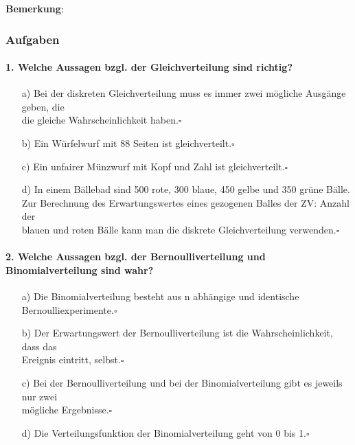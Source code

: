 \documentclass[a4paper]{article}
\begin{document}
\noindent \textbf{Bemerkung}: 


\clearpage
\subsubsection{Aufgaben}
\paragraph{1. Welche Aussagen bzgl. der Gleichverteilung sind richtig? }
\begin{itemize}
    \item[a)]Bei der diskreten Gleichverteilung muss es immer zwei mögliche Ausgänge geben, die\\ die gleiche Wahrscheinlichkeit haben.\hfill $\square$
    \item[b)]Ein Würfelwurf mit 88 Seiten ist gleichverteilt.\hfill $\square$
    \item[c)]Ein unfairer Münzwurf mit Kopf und Zahl ist gleichverteilt.\hfill $\square$
    \item[d)]In einem Bällebad sind 500 rote, 300 blaue, 450 gelbe und 350 grüne Bälle. \\Zur Berechnung des Erwartungswertes eines gezogenen Balles der ZV: Anzahl der\\ blauen und roten Bälle kann man die diskrete Gleichverteilung verwenden.\hfill $\square$
\end{itemize}

\paragraph{2. Welche Aussagen bzgl. der Bernoulliverteilung und Binomialverteilung sind wahr?}
\begin{itemize}
    \item[a)]Die Binomialverteilung besteht aus n abhängige und identische Bernoulliexperimente.\hfill $\square$
    \item[b)]Der Erwartungswert der Bernoulliverteilung ist die Wahrscheinlichkeit, dass das\\ Ereignis eintritt, selbst.\hfill $\square$
    \item[c)]Bei der Bernoulliverteilung und bei der Binomialverteilung gibt es jeweils nur zwei\\ mögliche Ergebnisse.\hfill $\square$
    \item[d)]Die Verteilungsfunktion der Binomialverteilung geht von 0 bis 1.\hfill $\square$
\end{itemize}
\end{document}
